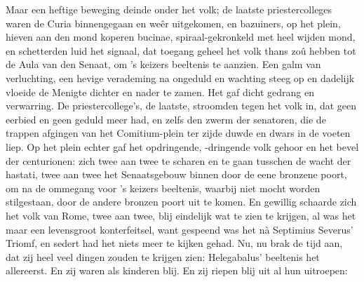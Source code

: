 \documentclass[a4paper, 12pt, oneside, dutch]{article}
\begin{document}
Maar een heftige beweging deinde onder het volk; de laatste priestercolleges waren de Curia binnengegaan en weêr uitgekomen, en bazuiners, op het plein, hieven aan den mond koperen bucinae, spiraal-gekronkeld met heel wijden mond, en schetterden luid het signaal, dat toegang geheel het volk thans zoû hebben tot de Aula van den Senaat, om 's keizers beeltenis te aanzien. Een galm van verluchting, een hevige verademing na ongeduld en wachting steeg op en dadelijk vloeide de Menigte dichter en nader te zamen. Het gaf dicht gedrang en verwarring. De priestercollege's, de laatste, stroomden tegen het volk in, dat geen eerbied en geen geduld meer had, en zelfs den zwerm der senatoren, die de trappen afgingen van het Comitium-plein ter zijde duwde en dwars in de voeten liep. Op het plein echter gaf het opdringende, -dringende volk gehoor en het bevel der centurionen: zich twee aan twee te scharen en te gaan tusschen de wacht der hastati, twee aan twee het Senaatsgebouw binnen door de eene bronzene poort, om na de ommegang voor 's keizers beeltenis, waarbij niet mocht worden stilgestaan, door de andere bronzen poort uit te komen. En gewillig schaarde zich het volk van Rome, twee aan twee, blij eindelijk wat te zien te krijgen, al was het maar een levensgroot konterfeitsel, want gespeend was het nà Septimius Severus' Triomf, en sedert had het niets meer te kijken gehad. Nu, nu brak de tijd aan, dat zij heel veel dingen zouden te krijgen zien: Helegabalus' beeltenis het allereerst. En zij waren als kinderen blij. En zij riepen blij uit al hun uitroepen:
\end{document}
